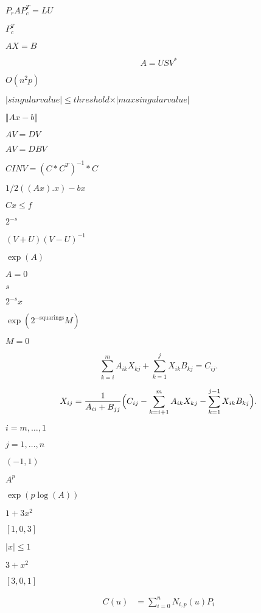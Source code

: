 \documentclass{article}
\begin{document}
$P_r A P_c^T = L U$
\pagebreak

$ P_c^T $
\pagebreak

$ A X = B $
\pagebreak

\[ A = U S V^* \]
\pagebreak

$ O(n^2p) $
\pagebreak

$ \vert singular value \vert \leqslant threshold \times \vert max singular value \vert $
\pagebreak

$ \Vert A x - b \Vert $
\pagebreak

$ A V = D V $
\pagebreak

$ A V = D B V $
\pagebreak

$ CINV = (C * C^T)^{-1} * C $
\pagebreak

$ 1/2((Ax).x) - bx $
\pagebreak

$ Cx \le f $
\pagebreak

$ 2^{-s} $
\pagebreak

$ (V+U)(V-U)^{-1} $
\pagebreak

$ \exp(A) $
\pagebreak

$ A = 0 $
\pagebreak

$ s $
\pagebreak

$ 2^{-s} x $
\pagebreak

$ \exp(2^{-\mbox{squarings}}M) $
\pagebreak

$ M = 0 $
\pagebreak

\[ 
    \sum_{k=i}^m A_{ik} X_{kj} + \sum_{k=1}^j X_{ik} B_{kj} = C_{ij}. 
\]
\pagebreak

\[ 
    X_{ij} = \frac{1}{A_{ii} + B_{jj}} \Bigl( C_{ij}
    - \sum_{k=i+1}^m A_{ik} X_{kj} - \sum_{k=1}^{j-1} X_{ik} B_{kj} \Bigr).
\]
\pagebreak

$ i=m,\ldots,1 $
\pagebreak

$ j=1,\ldots,n $
\pagebreak

$ (-1, 1) $
\pagebreak

$ A^p $
\pagebreak

$
\exp(p \log(A)) $
\pagebreak

$ 1 + 3x^2 $
\pagebreak

$ [ 1, 0, 3 ] $
\pagebreak

$ |x| \le 1 $
\pagebreak

$ 3 + x^2 $
\pagebreak

$ [ 3, 0, 1 ] $
\pagebreak

\begin{align*}
  C(u) & = \sum_{i=0}^{n}N_{i,p}(u)P_i
\end{align*}
\pagebreak
\end{document}

